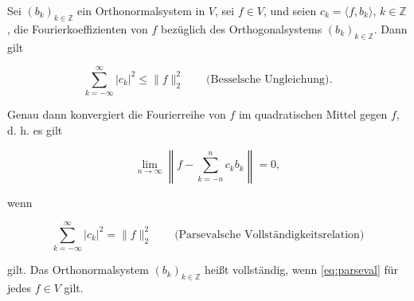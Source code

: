 \documentclass[a4paper, 12pt]{article}
\begin{document}
Sei $(b_k)_{k \in \mathbb{Z}}$ ein Orthonormalsystem in $V$, sei $f \in V$, und seien $c_k = \langle f, b_k \rangle$, $k \in \mathbb{Z}$, die Fourierkoeffizienten von $f$ bezüglich des Orthogonalsystems $(b_k)_{k \in \mathbb{Z}}$. Dann gilt

\begin{equation}
    \sum_{k = -\infty}^{\infty} |c_k|^2 \leq \|f\|^2_2 \qquad \text{(Besselsche Ungleichung).}
\end{equation}

Genau dann konvergiert die Fourierreihe von $f$ im quadratischen Mittel gegen $f$, d. h. es gilt

\begin{equation*}
    \lim_{n \to \infty} \left\| f - \sum_{k = -n}^{n} c_k b_k \right\| = 0,
\end{equation*}

wenn

\begin{equation}\label{eq:parseval}
    \sum_{k = -\infty}^{\infty} |c_k|^2 = \|f\|^2_2 \qquad \text{(Parsevalsche Vollst\"andigkeitsrelation)}
\end{equation}

gilt. Das Orthonormalsystem $(b_k)_{k \in \mathbb{Z}}$ heißt vollst\"andig, wenn \eqref{eq:parseval} f\"ur jedes $f \in V$ gilt.
\end{document}

